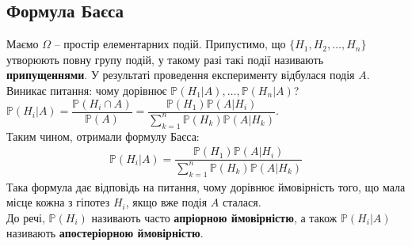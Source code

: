 \documentclass[a4paper, 10pt]{article}
\theoremstyle{theoremdd}
\begin{document}
\subsection{Формула Баєса}
Маємо $\Omega$ -- простір елементарних подій. Припустимо, що $\{H_1,H_2,\dots,H_n\}$ утворюють повну групу подій, у такому разі такі події називають \textbf{припущеннями}. У результаті проведення експерименту відбулася подія $A$. \\
Виникає питання: чому дорівнює $\mathbb{P}(H_1|A),\dots,\mathbb{P}(H_n|A)$?\\
$\mathbb{P}(H_i|A) = \dfrac{\mathbb{P}(H_i \cap A)}{\mathbb{P}(A)} = \dfrac{\mathbb{P}(H_1) \mathbb{P}(A|H_i)}{\displaystyle\sum_{k=1}^n \mathbb{P}(H_k) \mathbb{P}(A|H_k)}$.\\
Таким чином, отримали формулу Баєса:
\begin{align*}
\mathbb{P}(H_i|A) = \dfrac{\mathbb{P}(H_1) \mathbb{P}(A|H_i)}{\displaystyle\sum_{k=1}^n \mathbb{P}(H_k)\mathbb{P}(A|H_k)}
\end{align*}
Така формула дає відповідь на питання, чому дорівнює ймовірність того, що мала місце кожна з гіпотез $H_i$, якщо вже подія $A$ сталася.
\bigskip \\
До речі, $\mathbb{P}(H_i)$ називають часто \textbf{апріорною ймовірністю}, а також $\mathbb{P}(H_i | A)$ називають \textbf{апостеріорною ймовірністю}.
\end{document}
